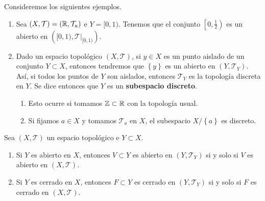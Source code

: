 \begin{eg}
	Consideremos los siguientes ejemplos.
	\begin{enumerate}
	\item Sea $\displaystyle \left(X, \mathcal{T}\right)=\left(\mathbb{R}, \mathcal{T}_{u}\right) $ e $\displaystyle Y = [0,1) $. Tenemos que el conjunto $\displaystyle \left[0, \frac{1}{2}\right) $ es un abierto en $\displaystyle \left([0,1), \mathcal{T}|_{[0,1)}\right) $.
	\item Dado un espacio topológico $\displaystyle \left(X, \mathcal{T}\right) $, si $\displaystyle y \in X $ es un punto aislado de un conjunto $\displaystyle Y \subset X $, entonces tendremos que $\displaystyle \left\{ y\right\}  $ es un abierto en $\displaystyle \left(Y, \mathcal{T}_{Y}\right) $. Así, si todos los puntos de $\displaystyle Y $ son aislados, entonces $\displaystyle \mathcal{T}_{Y} $ es la topología discreta en $\displaystyle Y $. Se dice entonces que $\displaystyle Y $ es un \textbf{subespacio discreto}. 
		\begin{enumerate}
		\item Esto ocurre si tomamos $\displaystyle \mathbb{Z} \subset \mathbb{R} $ con la topología usual.
		\item Si fijamos $\displaystyle a \in X $ y tomamos $\displaystyle \mathcal{T}_{a} $ en $\displaystyle X $, el subespacio $\displaystyle X / \left\{ a\right\}  $ es discreto.
		\end{enumerate}
	\end{enumerate}
\end{eg}
\begin{prop}
	Sea $\displaystyle \left(X, \mathcal{T}\right) $ un espacio topológico e $\displaystyle Y \subset X $. 
	\begin{enumerate}
	\item Si $\displaystyle Y $ es abierto en $\displaystyle X $, entonces $\displaystyle V \subset Y $ es abierto en $\displaystyle \left(Y, \mathcal{T}_{Y}\right) $ si y solo si $\displaystyle V $ es abierto en $\displaystyle \left(X, \mathcal{T}\right) $.
	\item Si $\displaystyle Y $ es cerrado en $\displaystyle X $, entonces $\displaystyle F\subset Y $ es cerrado en $\displaystyle \left(Y, \mathcal{T}_{Y}\right) $ si y solo si $\displaystyle F $ es cerrado en $\displaystyle \left(X, \mathcal{T}\right) $. 
	\end{enumerate}
\end{prop}
